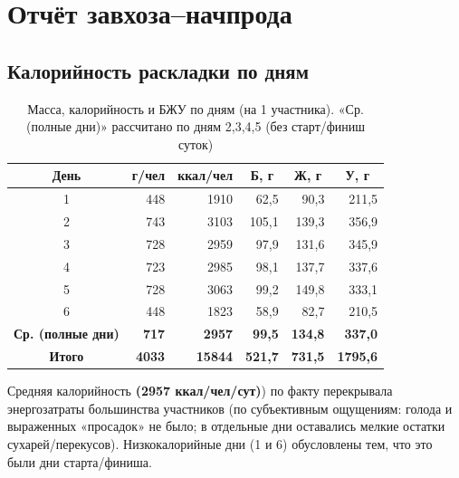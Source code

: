 \section{Отчёт завхоза--начпрода}
	\subsection{Калорийность раскладки по дням}
\begin{table}[htbp]
	\centering
	\scriptsize
	\setlength{\tabcolsep}{3.5pt}
	\renewcommand{\arraystretch}{1.10}
	\begin{tabular}{c r r r r r}
		\toprule
		День & \multicolumn{1}{c}{г/чел} & \multicolumn{1}{c}{ккал/чел} &
		\multicolumn{1}{c}{Б, г} & \multicolumn{1}{c}{Ж, г} & \multicolumn{1}{c}{У, г} \\
		\midrule
		1 & 448 & 1910 & 62,5 & 90,3 & 211,5 \\
		2 & 743 & 3103 & 105,1 & 139,3 & 356,9 \\
		3 & 728 & 2959 & 97,9 & 131,6 & 345,9 \\
		4 & 723 & 2985 & 98,1 & 137,7 & 337,6 \\
		5 & 728 & 3063 & 99,2 & 149,8 & 333,1 \\
		6 & 448 & 1823 & 58,9 & 82,7 & 210,5 \\
		\midrule
		\textbf{Ср. (полные дни)} & \textbf{717} & \textbf{2957} & \textbf{99,5} & \textbf{134,8} & \textbf{337,0} \\
		\textbf{Итого} & \textbf{4033} & \textbf{15844} & \textbf{521,7} & \textbf{731,5} & \textbf{1795,6} \\
		\bottomrule
	\end{tabular}
	\caption{Масса, калорийность и БЖУ по дням (на 1 участника). «Ср. (полные дни)» рассчитано по дням 2,3,4,5 (без старт/финиш суток)}
	\label{tab:day_bju}
\end{table}
	
	Средняя калорийность \textbf{(2957 ккал/чел/сут)}) по факту перекрывала энергозатраты большинства участников (по субъективным ощущениям: голода и выраженных «просадок» не было; в отдельные дни оставались мелкие остатки сухарей/перекусов). Низкокалорийные дни (1 и 6) обусловлены тем, что это были дни старта/финиша.
	
